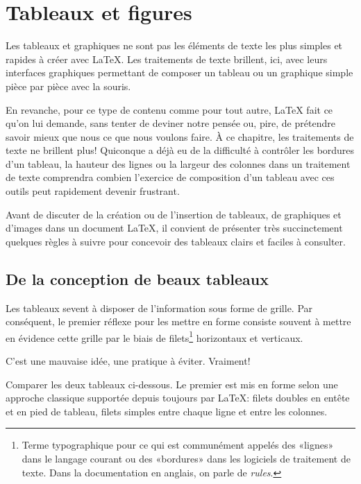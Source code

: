 \chapter{Tableaux et figures}
\label{chap:tableaux}

Les tableaux et graphiques ne sont pas les éléments de texte les plus
simples et rapides à créer avec {\LaTeX}. Les traitements de texte
brillent, ici, avec leurs interfaces graphiques permettant de composer
un tableau ou un graphique simple pièce par pièce avec la souris.

En revanche, pour ce type de contenu comme pour tout autre, {\LaTeX}
fait ce qu'on lui demande, sans tenter de deviner notre pensée ou,
pire, de prétendre savoir mieux que nous ce que nous voulons faire. À
ce chapitre, les traitements de texte ne brillent plus! Quiconque a
déjà eu de la difficulté à contrôler les bordures d'un tableau, la
hauteur des lignes ou la largeur des colonnes dans un traitement de
texte comprendra combien l'exercice de composition d'un tableau avec
ces outils peut rapidement devenir frustrant.

Avant de discuter de la création ou de l'insertion de tableaux, de
graphiques et d'images dans un document {\LaTeX}, il convient de
présenter très succinctement quelques règles à suivre pour concevoir
des tableaux clairs et faciles à consulter.


\section{De la conception de beaux tableaux}
\label{sec:tableaux:booktabs}

Les tableaux sevent à disposer de l'information sous forme de
grille. Par conséquent, le premier réflexe pour les mettre en forme
consiste souvent à mettre en évidence cette grille par le biais de
filets\footnote{%
  Terme typographique pour ce qui est communément appelés des «lignes»
  dans le langage courant ou des «bordures» dans les logiciels de
  traitement de texte. Dans la documentation en anglais, on parle de
  \emph{rules}.} %
horizontaux et verticaux.

C'est une mauvaise idée, une pratique à éviter. Vraiment!

Comparer les deux tableaux ci-dessous. Le premier est mis en forme
selon une approche classique supportée depuis toujours par {\LaTeX}:
filets doubles en entête et en pied de tableau, filets simples entre
chaque ligne et entre les colonnes.

